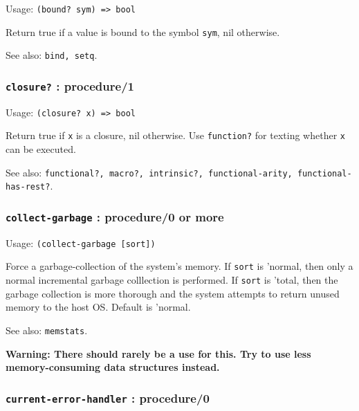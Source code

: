 \documentclass[
]{article}
\newcommand{\passthrough}[1]{#1}
\begin{document}
Usage: \passthrough{\lstinline!(bound? sym) => bool!}

Return true if a value is bound to the symbol
\passthrough{\lstinline!sym!}, nil otherwise.

See also: \passthrough{\lstinline!bind, setq!}.

\hypertarget{closure-procedure1}{%
\subsubsection{\texorpdfstring{\texttt{closure?} :
procedure/1}{closure? : procedure/1}}\label{closure-procedure1}}

Usage: \passthrough{\lstinline!(closure? x) => bool!}

Return true if \passthrough{\lstinline!x!} is a closure, nil otherwise.
Use \passthrough{\lstinline!function?!} for texting whether
\passthrough{\lstinline!x!} can be executed.

See also:
\passthrough{\lstinline!functional?, macro?, intrinsic?, functional-arity, functional-has-rest?!}.

\hypertarget{collect-garbage-procedure0-or-more}{%
\subsubsection{\texorpdfstring{\texttt{collect-garbage} : procedure/0 or
more}{collect-garbage : procedure/0 or more}}\label{collect-garbage-procedure0-or-more}}

Usage: \passthrough{\lstinline!(collect-garbage [sort])!}

Force a garbage-collection of the system's memory. If
\passthrough{\lstinline!sort!} is 'normal, then only a normal
incremental garbage colllection is performed. If
\passthrough{\lstinline!sort!} is 'total, then the garbage collection is
more thorough and the system attempts to return unused memory to the
host OS. Default is 'normal.

See also: \passthrough{\lstinline!memstats!}.

\textbf{Warning: There should rarely be a use for this. Try to use less
memory-consuming data structures instead.}

\hypertarget{current-error-handler-procedure0}{%
\subsubsection{\texorpdfstring{\texttt{current-error-handler} :
procedure/0}{current-error-handler : procedure/0}}\label{current-error-handler-procedure0}}
\end{document}
